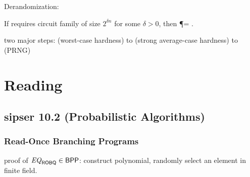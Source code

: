 \documentclass{article}
\begin{document}
Derandomization:

\begin{theorem}['98]
  If  requires circuit family of size \(2^{\delta n}\) for some \(\delta > 0\), then \P = \BPP.
\end{theorem}

two major steps: (worst-case hardness) to (strong average-case hardness) to (PRNG)

\section{Reading}

\subsection{sipser 10.2 (Probabilistic Algorithms)}

\subsubsection{Read-Once Branching Programs}

proof of \({\it EQ}_{\text{\sf ROBQ}} \in \text{\sf BPP}\): construct polynomial, randomly select an element in finite field.
\end{document}

